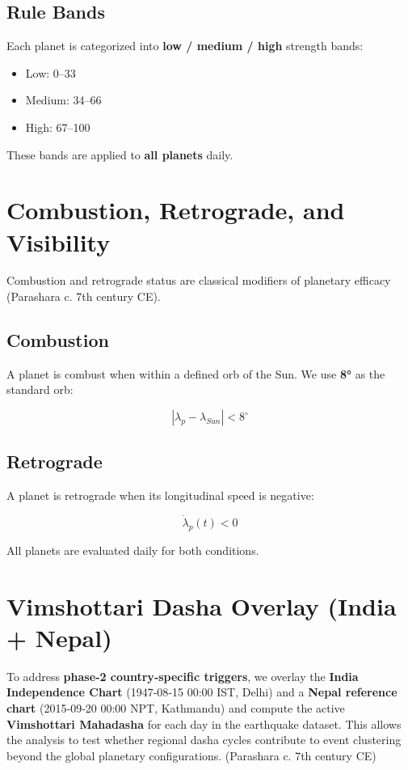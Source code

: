 \documentclass[
  11pt,
  a4paper,
  oneside,
  openany]{article}
\providecommand{\tightlist}{%
  \setlength{\itemsep}{0pt}\setlength{\parskip}{0pt}}\usepackage{longtable,booktabs,array}
\begin{document}
\subsection{Rule Bands}\label{rule-bands}

Each planet is categorized into \textbf{low / medium / high} strength
bands:

\begin{itemize}
\tightlist
\item
  Low: 0--33
\item
  Medium: 34--66
\item
  High: 67--100
\end{itemize}

These bands are applied to \textbf{all planets} daily.

\section{Combustion, Retrograde, and
Visibility}\label{combustion-retrograde-and-visibility}

Combustion and retrograde status are classical modifiers of planetary
efficacy (Parashara c. 7th century CE).

\subsection{Combustion}\label{combustion}

A planet is combust when within a defined orb of the Sun. We use
\textbf{8°} as the standard orb:

\[
|\lambda_p - \lambda_{Sun}| < 8^\circ
\]

\subsection{Retrograde}\label{retrograde}

A planet is retrograde when its longitudinal speed is negative:

\[
\dot{\lambda}_p(t) < 0
\]

All planets are evaluated daily for both conditions.

\section{Vimshottari Dasha Overlay (India +
Nepal)}\label{vimshottari-dasha-overlay-india-nepal}

To address \textbf{phase‑2 country‑specific triggers}, we overlay the
\textbf{India Independence Chart} (1947‑08‑15 00:00 IST, Delhi) and a
\textbf{Nepal reference chart} (2015‑09‑20 00:00 NPT, Kathmandu) and
compute the active \textbf{Vimshottari Mahadasha} for each day in the
earthquake dataset. This allows the analysis to test whether regional
dasha cycles contribute to event clustering beyond the global planetary
configurations. (Parashara c. 7th century CE)
\end{document}
